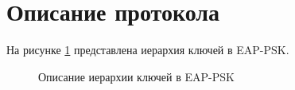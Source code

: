 \newpage
\section{Описание протокола}

На рисунке \ref{img:key_hierarchy} представлена иерархия ключей в EAP-PSK.

\begin{figure}[h!]
\caption{Описание иерархии ключей в EAP-PSK}
\label{img:key_hierarchy}
\end{figure}
